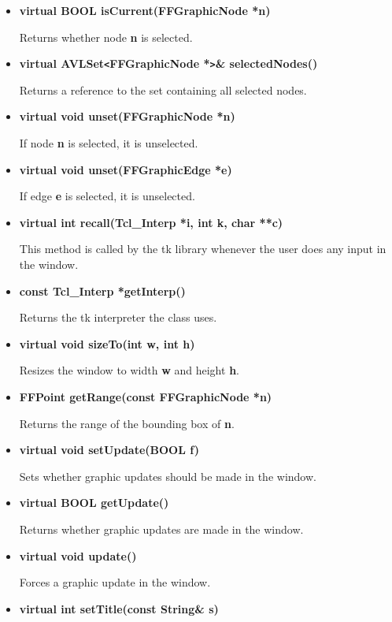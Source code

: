 \begin{itemize}
\item{\bf virtual BOOL isCurrent(FFGraphicNode *n)}

Returns whether node {\bf n} is selected.

\item{\bf virtual AVLSet\verb|<|FFGraphicNode *\verb|>|\& 
        selectedNodes()}

Returns a reference to the set containing all selected nodes.

\item{\bf virtual void unset(FFGraphicNode *n)}

If node {\bf n} is selected, it is unselected.

\item{\bf virtual void unset(FFGraphicEdge *e)}

If edge {\bf e} is selected, it is unselected.

\item{\bf virtual int recall(Tcl\_Interp *i, int k, char **c)}

This method is called by the tk library whenever the user does any
input in the window.

\item{\bf const Tcl\_Interp *getInterp()}

Returns the tk interpreter the class uses.

\item{\bf virtual void sizeTo(int w, int h)}

Resizes the window to width {\bf w} and height {\bf h}.

\item{\bf FFPoint getRange(const FFGraphicNode *n)}

Returns the range of the bounding box of {\bf n}.
  
\item{\bf virtual void setUpdate(BOOL f)}

Sets whether graphic updates should be made in the window.

\item{\bf virtual BOOL getUpdate()}

Returns whether graphic updates are made in the window.

\item{\bf virtual void update()}

Forces a graphic update in the window.
  
\item{\bf virtual int setTitle(const String\& s)}


\end{itemize}
